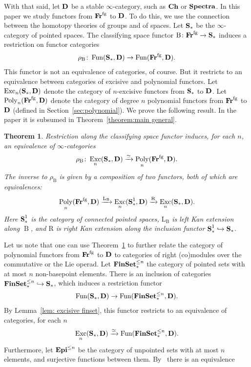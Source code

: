 \documentclass[psamsfonts]{amsart}
\theoremstyle{plain}
\newtheorem{mainthm}{Theorem}
\theoremstyle{definition}
\theoremstyle{remark}
\newcommand{\catname}[1]{{\normalfont\textbf{#1}}}
\newcommand{\finset}{\catname{FinSet}_*}
\newcommand{\epi}{\catname{Epi}}
\newcommand{\spaces}{\catname{S}_*}
\newcommand{\connected}{\spaces^{1}}
\newcommand{\fr}{\allfr^{\mathrm{fg}}}
\newcommand{\allfr}{\catname{Fr}}
\newcommand{\ch}{\catname{Ch}}
\newcommand{\classifying}{\operatorname{B}}
\newcommand{\lkan}{\mathrm{L}}
\newcommand{\rkan}{\mathrm{R}}
\DeclareMathOperator{\fun}{Fun}
\DeclareMathOperator{\poly}{Poly}
\DeclareMathOperator{\exc}{Exc}
\begin{document}
With that said, let $\catname{D}$ be a stable $\infty$-category, such as $\ch$ or $\catname{Spectra}$. In this paper we study functors from $\fr$ to $\catname{D}$. To do this, we use the connection between the homotopy theories of groups and of spaces. 
Let $\spaces$ be the $\infty$-category of pointed spaces. The classifying space functor $\classifying\colon \fr \to \spaces$ induces a restriction on functor categories
\[
\rho_{\classifying}\colon \fun(\spaces, \catname{D}) \to \fun(\fr, \catname{D}).
\]
This functor is not an equivalence of categories, of course. But it restricts to an equivalence between categories of excisive and polynomial functors. Let $\exc_n(\spaces, \catname{D})$ denote the category of $n$-excisive functors from $\spaces$ to $\catname{D}$. Let $\poly_n(\fr, \catname{D})$ denote the category of degree $n$ polynomial functors from $\fr$ to $\catname{D}$ (defined in Section~\ref{sec:polynomial}). We prove the following  result. In the paper it is subsumed in Theorem~\ref{theorem:main general}.
\begin{mainthm}\label{thm:main-general}
Restriction along the classifying space functor induces, for each $n$, an equivalence of $\infty$-categories
\[
\rho_{\classifying}\colon \exc_n(\spaces, \catname{D}) \xrightarrow{\simeq} \poly_n(\fr, \catname{D}).
\]
The inverse to $\rho_{\classifying}$ is given by a composition of two functors, both of which are equivalences:
\[
\poly_n(\fr, \catname{D})\xrightarrow{\lkan_{\classifying}} \exc_n(\connected, \catname{D})\xrightarrow{\rkan} \exc_n(\spaces, \catname{D}).
\]
Here $\connected$ is the category of \emph{connected} pointed spaces, $\lkan_{\classifying}$ is left Kan extension along $\classifying$, and $\rkan$  is right Kan extension along the inclusion functor $\connected \hookrightarrow \spaces$.
\end{mainthm}
Let us note that one can use Theorem~\ref{thm:main-general} to further relate the category of polynomial functors from $\fr$ to $\catname{D}$ to categories of right (co)modules over the commutative or the Lie operad. Let $\finset^{\le n}$ the category of pointed sets with at most $n$ non-basepoint elements. There is an inclusion of categories $\finset^{\le n}\hookrightarrow \spaces$, which induces a restriction functor
\[
\fun(\spaces, \catname{D})\to \fun(\finset^{\le n}, \catname{D}).
\]
By Lemma~\ref{lem: excisive finset}, this functor restricts to an equivalence of categories, for each $n$
\[
\exc_n(\spaces, \catname{D})\xrightarrow{\simeq} \fun(\finset^{\le n}, \catname{D}).
\]
Furthermore, let $\epi^{\le n}$ be the category of unpointed sets with at most $n$ elements, and surjective functions between them. By~\cite{Helmstutler, Walde} there is an equivalence
\end{document}
